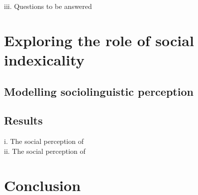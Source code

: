 \documentclass[PWPL]{article}
\begin{document}
iii. Questions to be answered\\
\section{Exploring the role of social indexicality}
\subsection{Modelling sociolinguistic perception}
\subsection{Results}
i. The social perception of \\
ii. The social perception of \\
\section{Conclusion}
\end{document}
